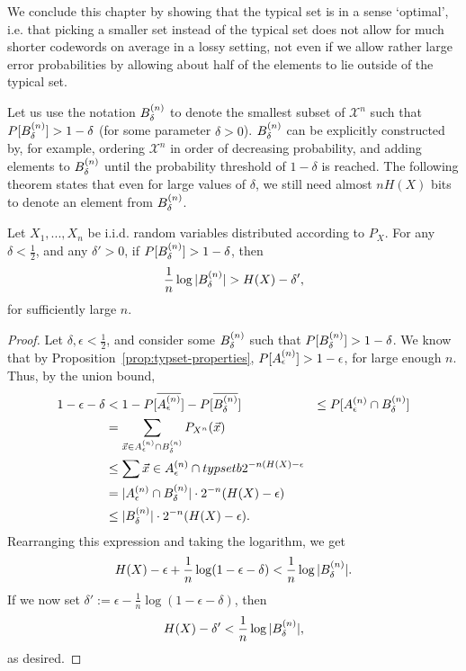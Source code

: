 We conclude this chapter by showing that the typical set is in a sense `optimal', i.e. that picking a smaller set instead of the typical set does not allow for much shorter codewords on average in a lossy setting, not even if we allow rather large error probabilities by allowing about half of the elements to lie outside of the typical set.

Let us use the notation $B_{\delta}^{(n)}$ to denote the smallest subset of $\mathcal{X}^n$ such that $P[B_{\delta}^{(n)}] > 1 - \delta$ (for some parameter $\delta > 0$). $B_{\delta}^{(n)}$ can be explicitly constructed by, for example, ordering $\mathcal{X}^n$ in order of decreasing probability, and adding elements to $B_{\delta}^{(n)}$ until the probability threshold of $1 - \delta$ is reached. The following theorem states that even for large values of $\delta$, we still need almost $n H(X)$ bits to denote an element from $B_{\delta}^{(n)}$.

\begin{theorem}
Let $X_1, ..., X_n$ be i.i.d. random variables distributed according to $P_X$. For any $\delta < \frac{1}{2}$, and any $\delta' > 0$, if $P[B_{\delta}^{(n)}] > 1 - \delta$, then
\[
\frac{1}{n} \log |B_{\delta}^{(n)}| > H(X) - \delta',
\]
for sufficiently large $n$.
\end{theorem}
\begin{proof}
Let $\delta,\epsilon < \frac{1}{2}$, and consider some $B_{\delta}^{(n)}$ such that $P[B_{\delta}^{(n)}] > 1 - \delta$. We know that by Proposition~\ref{prop:typset-properties}, $P[A_{\epsilon}^{(n)}] > 1 - \epsilon$, for large enough $n$. Thus, by the union bound,
\begin{align}
1 - \epsilon - \delta &< 1 - P[\overline{A_{\epsilon}^{(n)}}] - P[\overline{B_{\delta}^{(n)}}]\
&\leq P[A_{\epsilon}^{(n)} \cap B_{\delta}^{(n)}]\nonumber\\
&= \sum_{\vec{x} \in A_{\epsilon}^{(n)} \cap B_{\delta}^{(n)}} P_{X^n}(\vec{x})\nonumber\\
&\leq \sum{\vec{x} \in A_{\epsilon}^{(n)}\cap typsetb} 2^{-n(H(X) - \epsilon}\nonumber\\
&= |A_{\epsilon}^{(n)} \cap B_{\delta}^{(n)}| \cdot 2^{-n}(H(X) - \epsilon)\nonumber\\
&\leq |B_{\delta}^{(n)}| \cdot 2^{-n}(H(X) - \epsilon).
\end{align}
Rearranging this expression and taking the logarithm, we get
\begin{align}
H(X) - \epsilon + \frac{1}{n} \log (1 - \epsilon - \delta) < \frac{1}{n} \log |B_{\delta}^{(n)}|.
\end{align}
If we now set $\delta' := \epsilon - \frac{1}{n} \log (1 - \epsilon - \delta)$, then
\begin{align}
H(X) - \delta' < \frac{1}{n} \log |B_{\delta}^{(n)}|,
\end{align}
as desired.
\end{proof}



